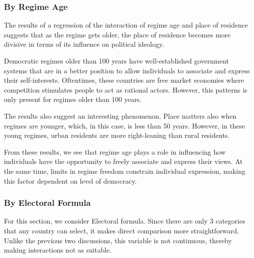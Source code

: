 \documentclass[12pt, titlepage]{article}
\begin{document}
\subsubsection{By Regime Age}

The results of a regression of the interaction of regime age and place of residence suggests that as the regime gets older, the place of residence becomes more divisive in terms of its influence on political ideology. 

Democratic regimes older than 100 years have well-established government systems that are in a better position to allow individuals to associate and express their self-interests. Oftentimes, these countries are free market economies where competition stimulates people to act as rational actors. However, this patterns is only present for regimes older than 100 years. 

The results also suggest an interesting phenomenon. Place matters also when regimes are younger, which, in this case, is less than 50 years. However, in these young regimes, urban residents are more right-leaning than rural residents. 

From these results, we see that regime age plays a role in influencing how individuals have the opportunity to freely associate and express their views. At the same time, limits in regime freedom constrain individual expression, making this factor dependent on level of democracy. 

\subsubsection{By Electoral Formula}

For this section, we consider Electoral formula. Since there are only 3 categories that any country can select, it makes direct comparison more straightforward. Unlike the previous two discussions, this variable is not continuous, thereby making interactions not as suitable.
\end{document}
